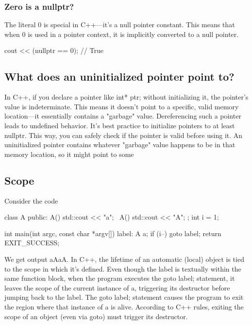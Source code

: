 \documentclass{report}
\begin{document}
    \bigbreak \noindent 
    \subsubsection{Zero is a nullptr?}
    \bigbreak \noindent 
    The literal 0 is special in C++—it’s a null pointer constant. This means that when 0 is used in a pointer context, it is implicitly converted to a null pointer.
    \bigbreak \noindent 
    \begin{cppcode}
    cout << (nullptr == 0); // True
    \end{cppcode}

    \bigbreak \noindent 
    \subsection{What does an uninitialized pointer point to?}
    \bigbreak \noindent 
    In C++, if you declare a pointer like int* ptr; without initializing it, the pointer's value is indeterminate. This means it doesn't point to a specific, valid memory location—it essentially contains a "garbage" value. Dereferencing such a pointer leads to undefined behavior. It's best practice to initialize pointers to at least nullptr. This way, you can safely check if the pointer is valid before using it.
    \bigbreak \noindent 
    An uninitialized pointer contains whatever "garbage" value happens to be in that memory location, so it might point to some



    \pagebreak 
    \bigbreak \noindent 
    \subsection{Scope}
    \bigbreak \noindent 
    Consider the code
    \bigbreak \noindent 
    \begin{cppcode}
        class A {
            public:
            A() { std::cout << "a"; }
            ~A() { std::cout << "A"; }
        };
        int i = 1;

        int main(int argc, const char *argv[]) {
        label:
            A a;
            if (i--)
            goto label;
            return EXIT_SUCCESS;
        }
    \end{cppcode}
    \bigbreak \noindent 
    We get output aAaA. In C++, the lifetime of an automatic (local) object is tied to the scope in which it’s defined. Even though the label is textually within the same function block, when the program executes the goto label; statement, it leaves the scope of the current instance of a, triggering its destructor before jumping back to the label.
    \bigbreak \noindent 
    The goto label; statement causes the program to exit the region where that instance of a is alive. According to C++ rules, exiting the scope of an object (even via goto) must trigger its destructor.
\end{document}
